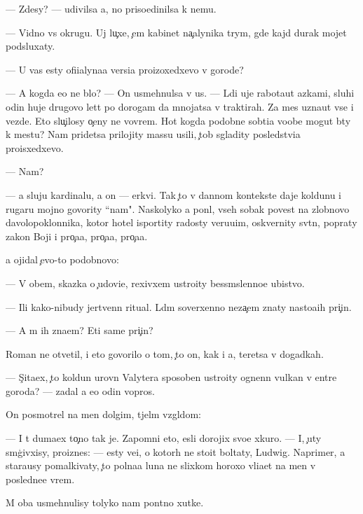 \documentclass[10pt]{book}
\begin{document}
— Zdesy? — udivilsa {\y}a, no priso{\y}edinilsa k nemu.

— Vidno vs{\iu} okrugu. Uj lu{\c}xe, {\c}em kabinet na{\c}alynika t{\iu}rym{\yi}, gde kajd{\yi}{\y} durak mojet podsluxaty.

— U vas {\y}esty ofi{\q}ialyna{\y}a versi{\y}a pro{\y}izoxedxevo v gorode?

— A kogda {\y}e{\y}o ne b{\yi}lo? — On usmehnulsa v us{\yi}. — L{\iu}di uje rabota{\y}ut {\y}az{\yi}kami, sluhi odin huje drugovo let{\ia}t po dorogam da mnojatsa v traktirah. Za mes{\ia}{\q} uzna{\y}ut vse i vezde. Eto slu{\c}ilosy o{\c}eny ne vovrem{\ia}. Hot{\ia} kogda podobn{\yi}{\y}e sob{\yi}ti{\y}a voob{\x}e mogut b{\yi}ty k mestu? Nam pridetsa prilojity massu usili{\y}, {\c}tob{\yi} sgladity posledstvi{\y}a pro{\y}isxedxevo.

— Nam?

— {\Y}a sluju kardinalu, a on — {\Q}erkvi. Tak {\c}to v dannom kontekste daje koldunu i rugaru mojno govority ``nam". Naskolyko {\y}a pon{\ia}l, vseh sobak poves{\ia}t na zlobnovo d{\y}avolopoklonnika, kotor{\yi}{\y} hotel isportity radosty veru{\y}u{\x}im, oskvernity sv{\ia}t{\yi}n{\iu}, popraty zakon{\yi} Boj{\yf}i i pro{\c}a{\y}a, pro{\c}a{\y}a, pro{\c}a{\y}a.

{\Y}a ojidal {\c}evo-to podobnovo:

— V ob{\x}em, skazka o {\c}udovi{\x}e, rexivxem ustro{\y}ity bessm{\yi}slenno{\y}e ubi{\y}stvo.

— Ili kako{\y}-nibudy jertvenn{\yi}{\y} ritual. L{\iu}d{\ia}m soverxenno neza{\c}em znaty nasto{\y}a{\x}ih pri{\c}in.

— A m{\yi} ih zna{\y}em? Eti sam{\yi}{\y}e pri{\c}in{\yi}?

Roman ne otvetil, i eto govorilo o tom, {\c}to on, kak i {\y}a, ter{\ia}{\y}etsa v dogadkah.

— S{\c}ita{\y}ex, {\c}to koldun urovn{\ia} Valytera sposoben ustro{\y}ity ognenn{\yi}{\y} vulkan v {\q}entre goroda? — zadal {\y}a {\y}e{\x}o odin vopros.

On posmotrel na men{\ia} dolgim, t{\ia}jel{\yi}m vzgl{\ia}dom:

— I t{\yi} duma{\y}ex to{\c}no tak je. Zapomni eto, {\y}esli dorojix svo{\y}e{\y} xkuro{\y}. — I, {\c}uty sm{\ia}g{\c}ivxisy, pro{\y}iznes: — {\Y}esty ve{\x}i, o kotor{\yi}h ne sto{\y}it boltaty, Ludwig. Naprimer, {\y}a stara{\y}usy pomalkivaty, {\c}to polna{\y}a luna ne slixkom horoxo vli{\y}a{\y}et na men{\ia} v posledne{\y}e vrem{\ia}.

M{\yi} oba usmehnulisy tolyko nam pon{\ia}tno{\y} xutke.
\end{document}
